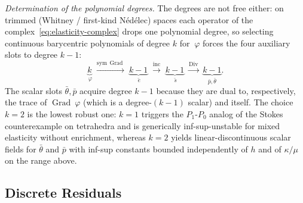 \documentclass[12pt]{article}
\newcommand{\ebar}{\bar{~e}}
\newcommand{\sbar}{\bar{~s}}
\newcommand{\thbar}{\bar{\theta}}
\newcommand{\pbar}{\bar{p}}
\DeclareMathOperator{\Div}{Div}
\DeclareMathOperator{\Grad}{Grad}
\begin{document}
\textit{Determination of the polynomial degrees.} The degrees are
not free either: on trimmed (Whitney / first-kind N\'ed\'elec)
spaces each operator of the
complex~\eqref{eq:elasticity-complex} drops one polynomial degree,
so selecting continuous barycentric polynomials of degree $k$ for $~\varphi$
forces the four auxiliary slots to degree $k-1$:
\begin{equation}
  \label{eq:degree-ladder}
  \underbrace{k}_{~\varphi}
  \;\xrightarrow{\mathrm{sym}\,\Grad}\;
  \underbrace{k-1}_{\ebar}
  \;\xrightarrow{\mathrm{inc}}\;
  \underbrace{k-1}_{\sbar}
  \;\xrightarrow{\Div}\;
  \underbrace{k-1}_{\pbar,\thbar}.
\end{equation}
The scalar slots $\thbar, \pbar$ acquire degree $k-1$ because they
are dual to, respectively, the trace of $\Grad ~\varphi$ (which is
a degree-$(k-1)$ scalar) and itself. The choice $k=2$ is the
lowest robust one: $k=1$ triggers the $P_1$-$P_0$ analog of the
Stokes counterexample on tetrahedra and is generically
inf-sup-unstable for mixed elasticity without enrichment, whereas
$k=2$ yields linear-discontinuous scalar fields for $\thbar$ and
$\pbar$ with inf-sup constants bounded independently of $h$ and of
$\kappa/\mu$ on the range above.

\subsection{Discrete Residuals}
\label{sec:discrete-residuals}
\end{document}
